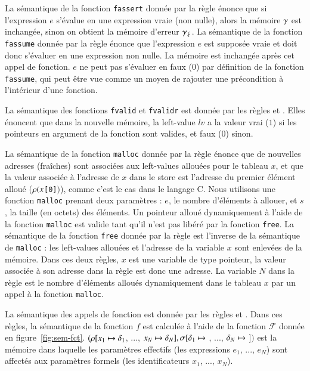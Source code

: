 La sémantique de la fonction \lstinline'fassert' donnée par la règle
 énonce que si l'expression $e$ s'évalue en une expression
vraie (non nulle), alors la mémoire $\gamma$ est inchangée, sinon on obtient
la mémoire d'erreur $\gamma_\lightning$.
La sémantique de la fonction \lstinline'fassume' donnée par la règle
 énonce que l'expression $e$ est supposée vraie et
doit donc s'évaluer en une expression non nulle.
La mémoire est inchangée après cet appel de fonction.
$e$ ne peut pas s'évaluer en faux ($0$) par définition de la fonction
\lstinline'fassume', qui peut être vue comme un moyen de rajouter une
précondition à l'intérieur d'une fonction.

La sémantique des fonctions \lstinline'fvalid' et \lstinline'fvalidr' est donnée
par les règles  et .
Elles énoncent que dans la nouvelle mémoire, la left-value $\mathit{lv}$ a
la valeur vrai ($1$) si les pointeurs en argument de la fonction sont valides,
et faux ($0$) sinon.

La sémantique de la fonction \lstinline'malloc' donnée par la règle
 énonce que de nouvelles adresses (fraîches) sont associées
aux left-values allouées pour le tableau $x$, et que la valeur
associée à l'adresse de $x$ dans le store est l'adresse du premier
élément alloué ($\rho(x$\lstinline'[0]'$)$), comme c'est le cas dans le langage
C.
Nous utilisons une fonction \lstinline'malloc' prenant deux paramètres :
$e$, le nombre d'éléments à allouer, et $s$, la taille (en octets) des éléments.
Un pointeur alloué dynamiquement à l'aide de la fonction \lstinline'malloc' est
valide tant qu'il n'est pas libéré par la fonction \lstinline'free'.
La sémantique de la fonction \lstinline'free' donnée par la règle
 est l'inverse de la sémantique de \lstinline'malloc' : les
left-values allouées et l'adresse de la variable $x$ sont enlevées de la
mémoire.
Dans ces deux règles, $x$ est une variable de type pointeur, la
valeur associée à son adresse dans la règle  est donc une
adresse.
La variable $N$ dans la règle  est le nombre d'éléments alloués
dynamiquement dans le tableau $x$ par un appel à la fonction \lstinline'malloc'.

La sémantique des appels de fonction est donnée par les règles 
et .
Dans ces règles, la sémantique de la fonction $f$ est calculée à
l'aide de la fonction $\mathcal{F}$ donnée en figure~\ref{fig:sem-fct}.
$(\rho[x_1 \mapsto \delta_1$, ...,
  $x_N \mapsto \delta_N], \sigma[\delta_1 \mapsto$
  , ...,
  $\delta_N \mapsto$  $])$
est la mémoire dans laquelle les paramètres effectifs (les expressions
$e_1$, ..., $e_N$) sont affectés aux paramètres formels (les identificateurs
$x_1$, ..., $x_N$).

